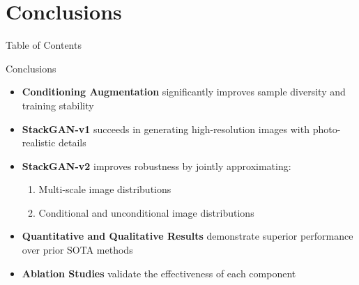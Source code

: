 \documentclass{beamer}
\begin{document}

\section{Conclusions}
\begin{frame}{Table of Contents}
    \tableofcontents[currentsection]
\end{frame}

\begin{frame}{Conclusions}
    \begin{itemize}
        \item \textbf{Conditioning Augmentation} significantly improves sample diversity and training stability
        \item \textbf{StackGAN-v1} succeeds in generating high-resolution images with photo-realistic details
        \item \textbf{StackGAN-v2} improves robustness by jointly approximating:
        \begin{enumerate}
            \item Multi-scale image distributions
            \item Conditional and unconditional image distributions
        \end{enumerate}
        \item \textbf{Quantitative and Qualitative Results} demonstrate superior performance over prior SOTA methods
        \item \textbf{Ablation Studies} validate the effectiveness of each component
    \end{itemize}
\end{frame}
\end{document}
